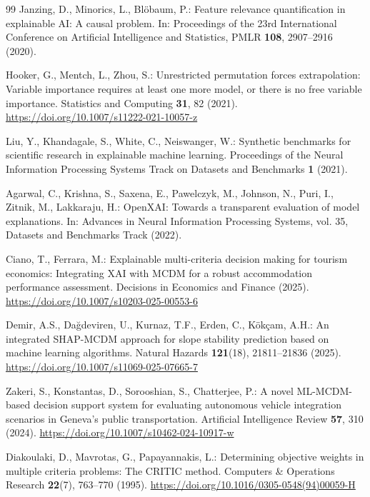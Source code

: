 \documentclass[runningheads,orivec]{llncs}
\begin{document}
\begin{thebibliography}{99}
Janzing, D., Minorics, L., Bl{\"o}baum, P.:
Feature relevance quantification in explainable AI: A causal problem.
In: Proceedings of the 23rd International Conference on Artificial Intelligence and
Statistics, PMLR \textbf{108}, 2907--2916 (2020).

Hooker, G., Mentch, L., Zhou, S.:
Unrestricted permutation forces extrapolation: Variable importance requires at least
one more model, or there is no free variable importance.
Statistics and Computing \textbf{31}, 82 (2021).
\url{https://doi.org/10.1007/s11222-021-10057-z}

Liu, Y., Khandagale, S., White, C., Neiswanger, W.:
Synthetic benchmarks for scientific research in explainable machine learning.
Proceedings of the Neural Information Processing Systems Track on Datasets and
Benchmarks \textbf{1} (2021).

Agarwal, C., Krishna, S., Saxena, E., Pawelczyk, M., Johnson, N., Puri, I., Zitnik, M.,
Lakkaraju, H.:
OpenXAI: Towards a transparent evaluation of model explanations.
In: Advances in Neural Information Processing Systems, vol. 35, Datasets and Benchmarks
Track (2022).

Ciano, T., Ferrara, M.:
Explainable multi-criteria decision making for tourism economics: Integrating XAI with
MCDM for a robust accommodation performance assessment.
Decisions in Economics and Finance (2025).
\url{https://doi.org/10.1007/s10203-025-00553-6}

Demir, A.S., Da{\u g}deviren, U., Kurnaz, T.F., Erden, C., K{\"o}k{\c c}am, A.H.:
An integrated SHAP-MCDM approach for slope stability prediction based on machine
learning algorithms.
Natural Hazards \textbf{121}(18), 21811--21836 (2025).
\url{https://doi.org/10.1007/s11069-025-07665-7}

Zakeri, S., Konstantas, D., Sorooshian, S., Chatterjee, P.:
A novel ML-MCDM-based decision support system for evaluating autonomous vehicle
integration scenarios in Geneva's public transportation.
Artificial Intelligence Review \textbf{57}, 310 (2024).
\url{https://doi.org/10.1007/s10462-024-10917-w}

Diakoulaki, D., Mavrotas, G., Papayannakis, L.:
Determining objective weights in multiple criteria problems: The CRITIC method.
Computers \& Operations Research \textbf{22}(7), 763--770 (1995).
\url{https://doi.org/10.1016/0305-0548(94)00059-H}


\end{thebibliography}
\end{document}
